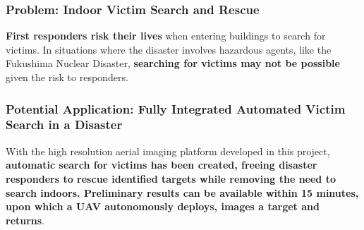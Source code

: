 \subsubsection{Problem: Indoor Victim Search and Rescue}
\noindent
\textbf{First responders risk their lives} when entering buildings to search for victims. In situations where the disaster involves hazardous agents, like the Fukushima Nuclear Disaster, \textbf{searching for victims may not be possible} given the risk to responders. %


\subsubsection{Potential Application: Fully Integrated Automated Victim Search in a Disaster}
\noindent
With the high resolution aerial imaging platform developed in this project, \textbf{automatic search for victims has been created, freeing disaster responders to rescue identified targets while removing the need to search indoors. Preliminary results can be available within 15 minutes, upon which a UAV autonomously deploys, images a target and returns}. 







